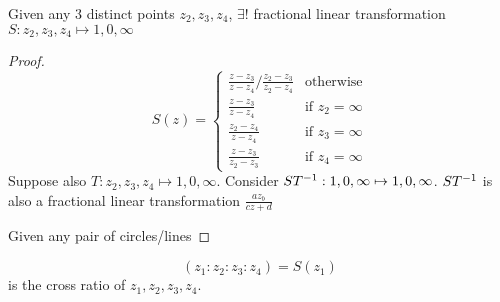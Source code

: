 \documentclass[a4paper,12pt]{article}
\begin{document}
\begin{theorem}
    Given any 3 distinct points $z_2,z_3,z_4$, $\exists!$ fractional linear transformation $S:z_2,z_3,z_4\mapsto 1,0,\infty$
    \begin{proof}
        \begin{equation}
            S(z)=\begin{cases}
                \frac{z-z_3}{z-z_4}\Big/\frac{z_2-z_3}{z_2-z_4} & \text{otherwise}\\
                \frac{z-z_3}{z-z_4} & \text{if }z_2=\infty\\
                \frac{z_2-z_4}{z-z_4} & \text{if }z_3=\infty\\
                \frac{z-z_3}{z_2-z_3} & \text{if }z_4=\infty
            \end{cases}
        \end{equation}
        Suppose also $T:z_2,z_3,z_4\mapsto 1,0,\infty$. Consider $ST^{-1}:1,0,\infty\mapsto 1,0,\infty$. $ST^{-1}$ is also a fractional linear transformation $\frac{az_b}{cz+d}$

        Given any pair of circles/lines
    \end{proof}
\end{theorem}
\begin{definition}
    \begin{equation}
        (z_1:z_2:z_3:z_4)=S(z_1)
    \end{equation}
    is the cross ratio of $z_1,z_2,z_3,z_4$.
\end{definition}
\end{document}
